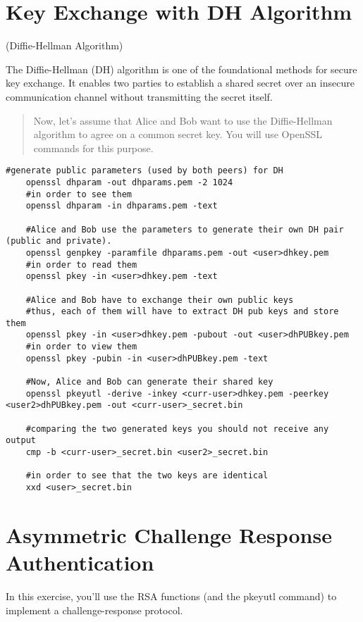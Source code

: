 \section{Key Exchange with DH Algorithm}

\begin{center}
    (Diffie-Hellman Algorithm)
\end{center}

The Diffie-Hellman (DH) algorithm is one of the foundational methods for secure key exchange. It enables two parties to establish a shared secret over an insecure communication channel without transmitting the secret itself.

\begin{quotation}
    Now, let’s assume that Alice and Bob want to use the Diffie-Hellman algorithm to agree on a common secret
key. You will use OpenSSL commands for this purpose.
\end{quotation}

\begin{lstlisting}[style=bashStyle]
    #generate public parameters (used by both peers) for DH
    openssl dhparam -out dhparams.pem -2 1024
    #in order to see them
    openssl dhparam -in dhparams.pem -text

    #Alice and Bob use the parameters to generate their own DH pair (public and private).
    openssl genpkey -paramfile dhparams.pem -out <user>dhkey.pem
    #in order to read them
    openssl pkey -in <user>dhkey.pem -text

    #Alice and Bob have to exchange their own public keys
    #thus, each of them will have to extract DH pub keys and store them
    openssl pkey -in <user>dhkey.pem -pubout -out <user>dhPUBkey.pem
    #in order to view them
    openssl pkey -pubin -in <user>dhPUBkey.pem -text

    #Now, Alice and Bob can generate their shared key
    openssl pkeyutl -derive -inkey <curr-user>dhkey.pem -peerkey <user2>dhPUBkey.pem -out <curr-user>_secret.bin 
    
    #comparing the two generated keys you should not receive any output
    cmp -b <curr-user>_secret.bin <user2>_secret.bin

    #in order to see that the two keys are identical
    xxd <user>_secret.bin

\end{lstlisting}

\section{Asymmetric Challenge Response Authentication}
In this exercise, you’ll use the RSA functions (and the pkeyutl command) to implement a challenge-response protocol.

